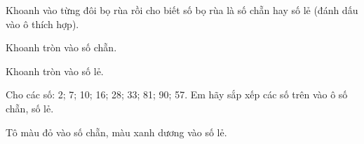 \documentclass[../main.tex]{subfiles}
\begin{document}
\begin{bt}
    Khoanh vào từng đôi bọ rùa rồi cho biết số bọ rùa là số chẵn hay số lẻ (đánh dấu vào ô thích hợp).
    \par\nopagebreak\vspace{4pt}\nopagebreak{\centering\SSghinho\par}\vspace{8pt}
    \noindent{}\hfill{}\par\smallskip
    \noindent{}\hfill{}\par
\end{bt}

\begin{bt}
    Khoanh tròn vào số chẵn.
    \par\nopagebreak\vspace{6pt}
\end{bt}

\begin{bt}
    Khoanh tròn vào số lẻ.
    \par\nopagebreak\vspace{6pt}
\end{bt}

\begin{bt}
    Cho các số: 2; 7; 10; 16; 28; 33; 81; 90; 57. Em hãy sắp xếp các số trên vào ô số chẵn, số lẻ.
    \par\nopagebreak\vspace{4pt}
\end{bt}

\begin{bt}
    Tô màu đỏ vào số chẵn, màu xanh dương vào số lẻ.
    \par\nopagebreak\vspace{4pt}
\end{bt}
\end{document}

